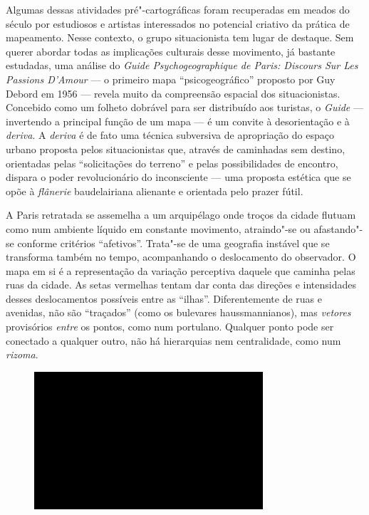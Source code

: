 Algumas dessas atividades pré"-cartográficas foram recuperadas em meados
do século  por estudiosos e artistas interessados no potencial
criativo da prática de mapeamento. Nesse contexto, o grupo situacionista
tem lugar de destaque. Sem querer abordar todas as implicações culturais
desse movimento, já bastante estudadas, uma análise do \emph{Guide
Psychogeographique de Paris: Discours Sur Les Passions D'Amour} --- o
primeiro mapa ``psicogeográfico'' proposto por Guy Debord em 1956 ---
revela muito da compreensão espacial dos situacionistas. Concebido como
um folheto dobrável para ser distribuído aos turistas, o \emph{Guide} ---
invertendo a principal função de um mapa --- é um convite à desorientação
e à \emph{deriva}. A \emph{deriva} é de fato uma técnica subversiva de
apropriação do espaço urbano proposta pelos situacionistas que, através
de caminhadas sem destino, orientadas pelas ``solicitações do terreno''
e pelas possibilidades de encontro, dispara o poder revolucionário do
inconsciente --- uma proposta estética que se opõe à \emph{flânerie}
baudelairiana alienante e orientada pelo prazer fútil.

A Paris retratada se assemelha a um arquipélago onde troços da cidade
flutuam como num ambiente líquido em constante movimento, atraindo"-se ou
afastando"-se conforme critérios ``afetivos''. Trata"-se de uma geografia
instável que se transforma também no tempo, acompanhando o deslocamento
do observador. O mapa em si é a representação da variação perceptiva
daquele que caminha pelas ruas da cidade. As setas vermelhas tentam dar
conta das direções e intensidades desses deslocamentos possíveis entre
as ``ilhas''. Diferentemente de ruas e avenidas, não são ``traçados''
(como os bulevares haussmannianos), mas \emph{vetores} provisórios
\emph{entre} os pontos, como num portulano. Qualquer ponto pode ser
conectado a qualquer outro, não há hierarquias nem centralidade, como
num \emph{rizoma}.

\begin{figure}[!ht]

\centering
 \includegraphics[width=85mm]{./imgs/im1.jpg}
\caption{\tiny{}}

\end{figure}

